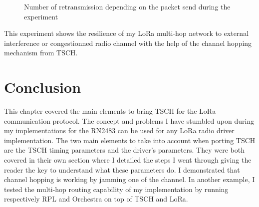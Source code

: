 \begin{figure}[H]
  \centering
  \caption{Number of retransmission depending on the packet send during the experiment\label{fig:retransmission}}
\end{figure}

This experiment shows the resilience of my LoRa multi-hop network to external
interference or congestionned radio channel with the help of the channel hopping
mechanism from TSCH.

\section{Conclusion}

This chapter covered the main elements to bring TSCH for the LoRa communication
protocol.
The concept and problems I have stumbled upon during my implementations for the
RN2483 can be used for any LoRa radio driver implementation.
The two main elements to take into account when porting TSCH are the TSCH timing
parameters and the driver's parameters.
They were both covered in their own section where I detailed the steps I went
through giving the reader the key to understand what these parameters do.
I demonstrated that channel hopping is working by jamming one of
the channel.
In another example, I tested the multi-hop routing capability of my
implementation by running respectively RPL and Orchestra on top of TSCH and
LoRa.

